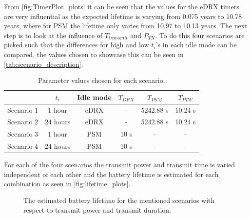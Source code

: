 From \autoref{fig:TimerPlot_plots} it can be seen that the values for the eDRX timers are very influential as the expected lifetime is varying  from 0.075 years to 10.78 years, where for PSM the lifetime only varies from 10.97 to 10.13 years. The next step is to look at the influence of $T_{transmit}$ and $P_{TX}$. To do this four scenarios are picked such that the differences for high and low $t_i$'s in each idle mode can be compared, the values chosen to showcase this can be seen in \autoref{tab:scenario_description}.


\begin{table}[H]
\centering
\begin{tabular}{|c|c|c|c|c|c|} \hline
			& $t_i$ 		& Idle mode	& $T_{DRX}$	& $T_{PSM}$	& $T_{PTW}$	\\ \hline
Scenario 1	& 1 hour 	& eDRX 		& -			& 5242.88 s	& 10.24 s	\\ \hline
Scenario 2	& 24 hours 	& eDRX 		& -			& 5242.88 s	& 10.24 s	\\ \hline
Scenario 3	& 1 hour 	& PSM		& 10 s		& -			& -			\\ \hline
Scenario 4	& 24 hours 	& PSM		& 10 s		& -			& -			\\ \hline
\end{tabular}
\caption{Parameter values chosen for each scenario.}
\label{tab:scenario_description}
\end{table}

For each of the four scenarios the transmit power and transmit time is varied independent of each other and the battery lifetime is estimated for each combination as seen in \autoref{fig:lifetime_plots}.


\begin{figure}[H]
\centering
\begin{minipage}{0.48\textwidth}
\resizebox{\textwidth}{!}{
}
\end{minipage}
\hfill
\begin{minipage}{0.48\textwidth}
\resizebox{\textwidth}{!}{
}
\end{minipage}
\begin{minipage}{0.48\textwidth}
\resizebox{\textwidth}{!}{
}
\end{minipage}
\hfill
\begin{minipage}{0.48\textwidth}
\resizebox{\textwidth}{!}{
}
\end{minipage}
\caption{The estimated battery lifetime for the mentioned scenarios with respect to transmit power and transmit duration.}
\label{fig:lifetime_plots}
\end{figure}

